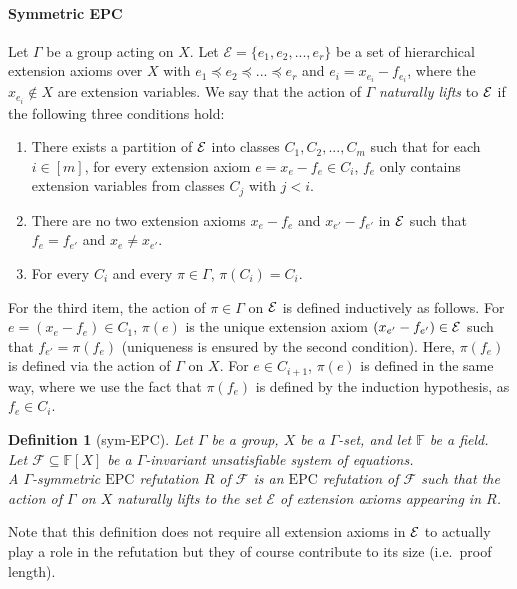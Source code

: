 \documentclass[10pt,a4paper]{article}
\newtheorem{definition}[theorem]{Definition}
\newcommand{\EPC}{\mathrm{EPC}}
\newcommand{\Ee}{{\cal E}}
\newcommand{\Field}{\ensuremath{\mathbb{F}}}
\newcommand{\F}{\ensuremath{\mathcal{F}}}
\begin{document}
\paragraph*{Symmetric EPC}
Let $\Gamma$ be a group acting on $X$.
Let $\mathcal E = \{e_1,e_2,...,e_r\}$ be a set of hierarchical extension axioms over $X$ with
$e_1\preceq e_2\preceq ... \preceq e_r$
and $e_i = x_{e_i} - f_{e_i}$, where the $x_{e_i} \notin X$ are extension variables. 
We say that the action of $\Gamma$ \emph{naturally lifts} to $\Ee$ if the following three conditions hold: 
\begin{enumerate}
	\item There exists a partition of $\Ee$ into classes $C_1,C_2,...,C_m$ such that for each $i \in [m]$, for every extension axiom $e = x_e - f_e \in C_i$, $f_e$ only contains extension variables from classes $C_j$ with $j < i$.
	\item There are no two extension axioms $x_{e} - f_e$ and $x_{e'} - f_{e'}$ in $\Ee$ such that $f_e = f_{e'}$ and $x_e \neq x_{e'}$.
	\item For every $C_i$ and every $\pi \in \Gamma$, $\pi(C_i) = C_i$.
\end{enumerate}
For the third item, the action of $\pi \in \Gamma$ on $\Ee$ is defined inductively as follows. For $e = (x_e - f_e) \in C_1$, $\pi(e)$ is the unique extension axiom $(x_{e'} - f_{e'}) \in \Ee$ such that $f_{e'} = \pi(f_e)$ (uniqueness is ensured by the second condition). Here, $\pi(f_e)$ is defined via the action of $\Gamma$ on $X$. For $e \in C_{i+1}$, $\pi(e)$ is defined in the same way, where we use the fact that $\pi(f_e)$ is defined by the induction hypothesis, as $f_e \in C_i$.

\begin{definition}[sym-EPC]
	\label{def:symEPC}
	Let $\Gamma$ be a group, $X$ be a $\Gamma$-set, and let $\Field$ be a field. \\
	Let $\F \subseteq \Field[X]$ be a $\Gamma$-invariant unsatisfiable system of equations.\\
	A $\Gamma$-symmetric $\EPC$ refutation $R$ of $\F$ is an $\EPC$ refutation of $\F$ such that the action of $\Gamma$ on $X$ \emph{naturally lifts} to the set $\mathcal E$ of extension axioms appearing in $R$.
\end{definition}
Note that this definition does not require all extension axioms in $\Ee$ to actually play a role in the refutation but they of course contribute to its size (i.e.\ proof length).
\end{document}
